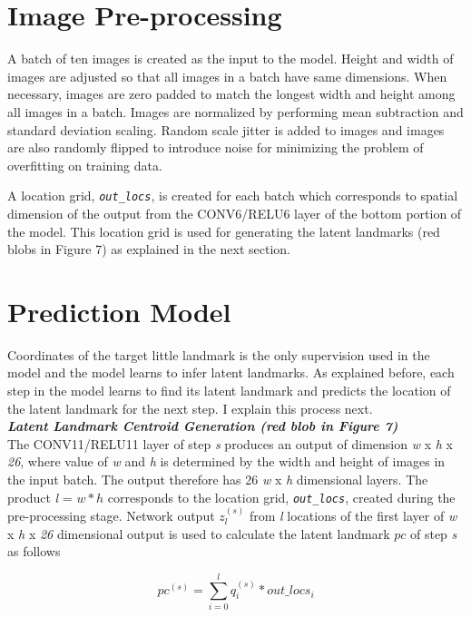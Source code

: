 \documentclass [11pt,letterpaper ,twoside ,openany ]{report}
\begin{document}
    \section{Image Pre-processing}
    A batch of ten images is created as the input to the model. Height and width of images are adjusted so that all images in a batch have same dimensions. When necessary, images are zero padded to match the longest width and height among all images in a batch. Images are normalized by performing mean subtraction and standard deviation scaling. Random scale jitter is added to images and images are also randomly flipped to introduce noise for minimizing the problem of overfitting on training data.

    A location grid, \textit{\texttt{out\_locs}},  is created for each batch which corresponds to spatial dimension of the output from the CONV6/RELU6 layer of the bottom portion of the model. This location grid is used for generating the latent landmarks (red blobs in Figure 7) as explained in the next section.

    \section{Prediction Model}
    Coordinates of the target little landmark is the only supervision used in the model and the model learns to infer latent landmarks. As explained before, each step in the model learns to find its latent landmark and predicts the location of the latent landmark for the next step. I explain this process next.\\

    \noindent
    \textbf{\textit{Latent Landmark Centroid Generation (red blob in Figure 7)}}\\
    The CONV11/RELU11 layer of step \textit {s} produces an output of dimension \textit {w} x \textit {h} x \textit {26}, where value of \textit {w} and \textit {h} is determined by the width and height of images in the input batch. The output therefore has 26 \textit {w} x \textit {h} dimensional layers. The product \textit {l} = \(w*h\) corresponds to the location grid, \textit{\texttt{out\_locs}}, created during the pre-processing stage. Network output \(z_l^{(s)}\) from \textit {l} locations of the first layer of \textit {w} x \textit {h} x \textit {26} dimensional output is used to calculate the latent landmark \(pc\) of step \textit {s} as follows    

    \[ pc^{(s)} = \displaystyle\sum_{i=0}^{l} q^{(s)}_i * \textit{out\_locs}_i \tag{1}\]
\end{document}
